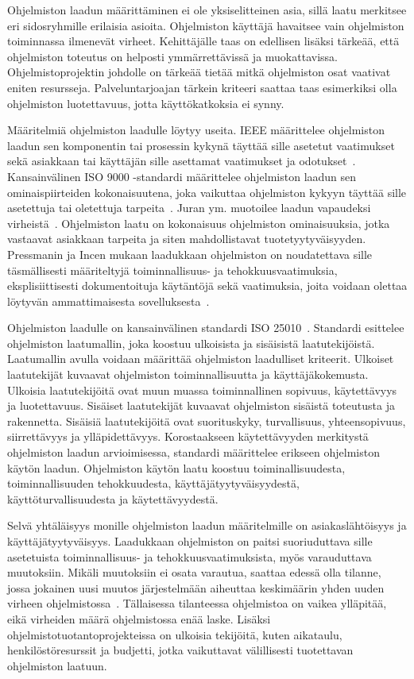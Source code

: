 \documentclass[finnish]{tktltiki2}
\theoremstyle{definition}
\theoremstyle{remark}
\begin{document}
Ohjelmiston laadun määrittäminen ei ole yksiselitteinen asia, sillä laatu merkitsee eri sidosryhmille erilaisia asioita. Ohjelmiston käyttäjä havaitsee vain ohjelmiston toiminnassa ilmenevät virheet. Kehittäjälle taas on edellisen lisäksi tärkeää, että ohjelmiston toteutus on helposti ymmärrettävissä ja muokattavissa. Ohjelmistoprojektin johdolle on tärkeää tietää mitkä ohjelmiston osat vaativat eniten resursseja. Palveluntarjoajan tärkein kriteeri saattaa taas esimerkiksi olla ohjelmiston luotettavuus, jotta käyttökatkoksia ei synny.

Määritelmiä ohjelmiston laadulle löytyy useita. IEEE määrittelee ohjelmiston laadun sen komponentin tai prosessin kykynä täyttää sille asetetut vaatimukset sekä asiakkaan tai käyttäjän sille asettamat vaatimukset ja odotukset~\cite{IEEE90}. Kansainvälinen ISO 9000 -standardi määrittelee ohjelmiston laadun sen ominaispiirteiden kokonaisuutena, joka vaikuttaa ohjelmiston kykyyn täyttää sille asetettuja tai oletettuja tarpeita~\cite{ISO9000, MD06}. Juran ym. muotoilee laadun vapaudeksi virheistä~\cite{JGB74}. Ohjelmiston laatu on kokonaisuus ohjelmiston ominaisuuksia, jotka vastaavat asiakkaan tarpeita ja siten mahdollistavat tuotetyytyväisyyden. Pressmanin ja Incen mukaan laadukkaan ohjelmiston on noudatettava sille täsmällisesti määriteltyjä toiminnallisuus- ja tehokkuusvaatimuksia, eksplisiittisesti dokumentoituja käytäntöjä sekä vaatimuksia, joita voidaan olettaa löytyvän ammattimaisesta sovelluksesta~\cite{PI92}.

Ohjelmiston laadulle on kansainvälinen standardi ISO 25010~\cite{ISO25010}. Standardi esittelee ohjelmiston laatumallin, joka koostuu ulkoisista ja sisäisistä laatutekijöistä. Laatumallin avulla voidaan määrittää ohjelmiston laadulliset kriteerit. Ulkoiset laatutekijät kuvaavat ohjelmiston toiminnallisuutta ja käyttäjäkokemusta. Ulkoisia laatutekijöitä ovat muun muassa toiminnallinen sopivuus, käytettävyys ja luotettavuus. Sisäiset laatutekijät kuvaavat ohjelmiston sisäistä toteutusta ja rakennetta. Sisäisiä laatutekijöitä ovat suorituskyky, turvallisuus, yhteensopivuus, siirrettävyys ja ylläpidettävyys. Korostaakseen käytettävyyden merkitystä ohjelmiston laadun arvioimisessa, standardi määrittelee erikseen ohjelmiston käytön laadun. Ohjelmiston käytön laatu koostuu toiminallisuudesta, toiminnallisuuden tehokkuudesta, käyttäjätyytyväisyydestä, käyttöturvallisuudesta ja käytettävyydestä.

Selvä yhtäläisyys monille ohjelmiston laadun määritelmille on asiakaslähtöisyys ja käyttäjätyytyväisyys. Laadukkaan ohjelmiston on paitsi suoriuduttava sille asetetuista toiminnallisuus- ja tehokkuusvaatimuksista, myös varauduttava muutoksiin. Mikäli muutoksiin ei osata varautua, saattaa edessä olla tilanne, jossa jokainen uusi muutos järjestelmään aiheuttaa keskimäärin yhden uuden virheen ohjelmistossa~\cite{LB85}. Tällaisessa tilanteessa ohjelmistoa on vaikea ylläpitää, eikä virheiden määrä ohjelmistossa enää laske. Lisäksi ohjelmistotuotantoprojekteissa on ulkoisia tekijöitä, kuten aikataulu, henkilöstöresurssit ja budjetti, jotka vaikuttavat välillisesti tuotettavan ohjelmiston laatuun.
\end{document}
